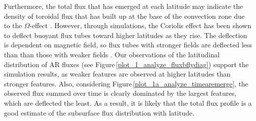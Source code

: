 \documentclass[namedreferences]{solarphysics}
\begin{document}
\begin{article}
Furthermore, the total flux that has emerged at each latitude may indicate the density of toroidal flux that has built up at the base of the convection zone due to the $\Omega$-effect \citep{Charbonneau:2010}. However, through simulations, the Coriolis effect has been shown to deflect buoyant flux tubes toward higher latitudes as they rise. The deflection is dependent on magnetic field, so flux tubes with stronger fields are deflected less than than those with weaker fields \citep[][and references therein]{Fan:2009}. 
Our observations of the latitudinal distribution of AR fluxes (see Figure\,\ref{plot_1_analyze_fluxbflydiag}) support the simulation results, as weaker features are observed at higher latitudes than stronger features. Also, considering Figure\,\ref{plot_1a_analyze_timearemerge}, the observed flux summed over time is clearly dominated by the largest features, which are deflected the least. As a result, it is likely that the total flux profile is a good estimate of the subsurface flux distribution with latitude.




\begin{figure*}[!ht]
 

\end{figure*}
\end{article}
\end{document}
